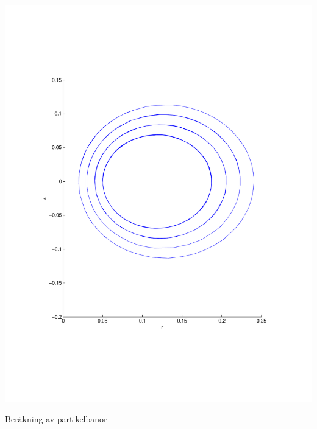 \documentclass[a4paper]{article}
\begin{document}
\includegraphics[scale=0.5]{ovals.pdf}

\clearpage
\centerline{\sc Beräkning av partikelbanor}
\vspace{2pc}
\end{document}
